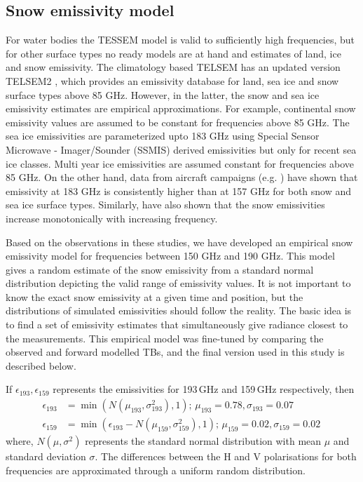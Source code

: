 \documentclass[amt, manuscript]{copernicus}
\begin{document}
\subsection{Snow emissivity model}
\label{sec:snow_emissivity}

For water bodies the TESSEM model is valid to sufficiently high frequencies, but for other surface types no ready models are at hand and estimates of land, ice and snow emissivity. The climatology based TELSEM has an updated version TELSEM2 \citep{wang:surfa:17}, which provides an emissivity database for land, sea ice and snow surface types above 85 GHz. However, in the latter,  the snow and sea ice emissivity estimates are empirical approximations. For example, continental snow emissivity values are assumed to be constant for frequencies above 85 GHz. The sea ice emissivities are parameterized upto 183 GHz using Special Sensor Microwave - Imager/Sounder (SSMIS) derived emissivities \citep{boukabara2011mirs} but only for recent sea ice classes. Multi year ice emissivities are assumed constant for frequencies above 85 GHz. On the other hand, data from aircraft campaigns (e.g. \citet{hewison:2002:airbo}) have shown that emissivity at 183 GHz is consistently higher than at 157 GHz for both snow and sea ice surface types. Similarly, \citet{harlow:2012:tundr} have also shown that the snow emissivities increase monotonically with increasing frequency. 

Based on the observations in these studies, we have developed an empirical snow emissivity model for frequencies between 150\,\,GHz and 190\,\,GHz. This model gives a random estimate of the snow emissivity from a standard normal distribution depicting the valid range of emissivity values. It is not important to know the exact snow emissivity at a given time and position, but the distributions of simulated emissivities should follow the reality. The basic idea is to find a set of emissivity estimates that simultaneously give radiance closest to the measurements. This empirical model was fine-tuned by comparing the observed and forward modelled TBs, and the final version used in this study is described below. 

If $\epsilon_{193}, \epsilon_{159}$ represents the emissivities for 193\,GHz and
159\,GHz respectively, then
\begin{align}
\epsilon_{193}& = \min({N(\mu_{193}, \sigma_{193}^{2}), 1});\, \mu_{193} = 0.78, \sigma_{193} = 0.07 \label{eq:1}\\
\epsilon_{159}& = \min(\epsilon_{193} - N(\mu_{159}, \sigma_{159}^{2}), 1) ;\,  \mu_{159} = 0.02, \sigma_{159} = 0.02\,\label{eq:2}
\end{align}
where, $N(\mu, \sigma^{2})$ represents the standard normal distribution with
mean $\mu$ and standard deviation $\sigma$. The differences between the
H  and V polarisations for both frequencies are 
approximated through a uniform random distribution.
\end{document}
